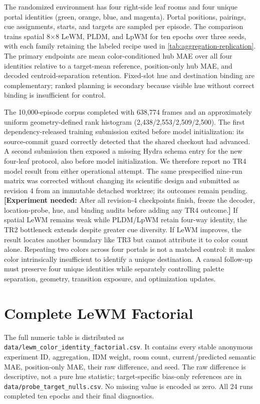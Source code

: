 \documentclass{article}
\newcommand{\experimentneeded}[1]{\textcolor{resultred}{\textbf{[Experiment needed:} #1\textbf{]}}}
\begin{document}
The randomized environment has four right-side leaf rooms and four unique
portal identities (green, orange, blue, and magenta).  Portal positions,
pairings, cue assignments, starts, and targets are sampled per episode.  The
comparison trains spatial 8$\times$8 LeWM, PLDM, and LpWM for ten epochs over
three seeds, with each family retaining the labeled recipe used in
\cref{tab:aggregation-replication}.  The primary endpoints are mean
color-conditioned hub MAE over all four identities relative to a target-mean
reference, position-only hub MAE, and decoded centroid-separation retention.
Fixed-slot hue and destination binding are complementary; ranked planning is
secondary because visible hue without correct binding is insufficient for
control.

The 10,000-episode corpus completed with 638,774 frames and an approximately
uniform geometry-defined rank histogram (2,438/2,553/2,509/2,500). The first
dependency-released training submission exited before model initialization:
its source-commit guard correctly detected that the shared checkout had
advanced. A second submission then exposed a missing Hydra schema entry for
the new four-leaf protocol, also before model initialization. We therefore
report no TR4 model result from either operational attempt. The same
prespecified nine-run matrix was corrected without changing its scientific
design and submitted as revision 4 from an immutable detached worktree; its
outcomes remain pending.
\experimentneeded{After all revision-4 checkpoints finish, freeze the decoder,
location-probe, hue, and binding audits before adding any TR4 outcome.}
If spatial LeWM remains weak while PLDM/LpWM retain four-way identity, the TR2
bottleneck extends despite greater cue diversity.  If LeWM improves, the result
locates another boundary like TR3 but cannot attribute it to color count alone.
Repeating two colors across four portals is not a matched control: it makes
color intrinsically insufficient to identify a unique destination.  A causal
follow-up must preserve four unique identities while separately controlling
palette separation, geometry, transition exposure, and optimization updates.

\section{Complete LeWM Factorial}

The full numeric table is distributed as
\texttt{data/lewm\_color\_identity\_factorial.csv}.  It contains every stable
anonymous experiment ID, aggregation, IDM weight, room count, current/predicted semantic MAE,
position-only MAE, their raw difference, and seed.  The raw difference is
descriptive, not a pure hue statistic; target-specific bias-only references
are in \texttt{data/probe\_target\_nulls.csv}.  No missing value is encoded as zero.
All 24 runs completed ten epochs and their final diagnostics.
\end{document}
